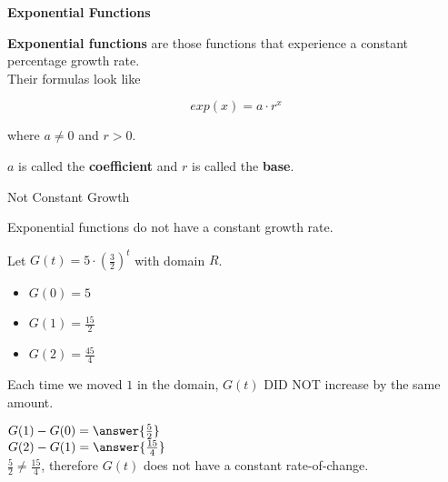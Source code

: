 \documentclass{ximera}
\begin{document}
\begin{definition} \textbf{\textcolor{green!50!black}{Exponential Functions}}


\textbf{Exponential functions} are those functions that experience a constant percentage growth rate. \\


Their formulas look like

\[
exp(x) = a \cdot r^x
\]


where $a \ne 0$ and $r > 0$.

$a$ is called the \textbf{coefficient} and $r$ is called the \textbf{base}.

\end{definition}

















\begin{fact}  Not Constant Growth



Exponential functions do not have a constant growth rate. \\

\begin{explanation}

Let $G(t) = 5 \cdot \left(\frac{3}{2}\right)^t$ with domain \textbf{$R$}. 






\begin{itemize}
\item $G(0) = 5$
\item $G(1) = \frac{15}{2}$
\item $G(2) = \frac{45}{4}$
\end{itemize}



Each time we moved $1$ in the domain, $G(t)$ DID NOT increase by the same amount.

$G(1) - G(0) = \answer{\frac{5}{2}}$ \\

$G(2) - G(1) = \answer{\frac{15}{4}}$ \\

$ \frac{5}{2}  \ne  \frac{15}{4} $, therefore $G(t)$ does not have a constant rate-of-change. \\


\end{explanation}

\end{fact}
\end{document}
